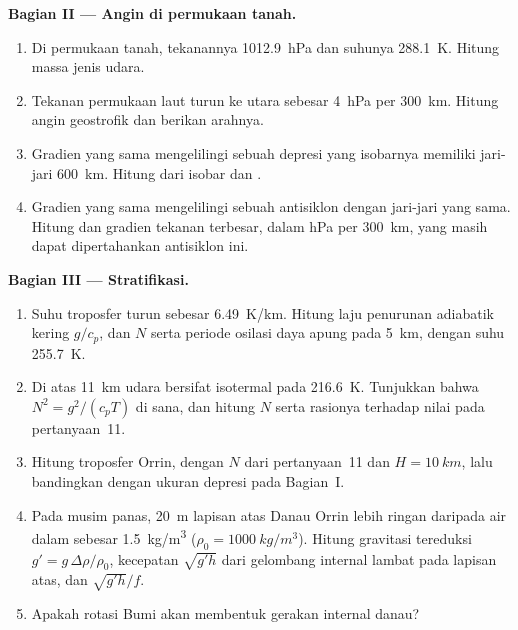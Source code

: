 \begin{problem}
\medskip\noindent\textbf{Bagian II --- Angin di permukaan tanah.}
\begin{enumerate}[resume]
\item Di permukaan tanah, tekanannya \qty{1012.9}{hPa} dan suhunya
  \qty{288.1}{K}. Hitung massa jenis udara.
\item Tekanan permukaan laut turun ke utara sebesar \qty{4}{hPa} per
  \qty{300}{km}. Hitung angin geostrofik dan berikan arahnya.
\item Gradien yang sama mengelilingi sebuah depresi yang isobarnya memiliki jari-jari
  \qty{600}{km}. Hitung  dari isobar dan
  .
\item Gradien yang sama mengelilingi sebuah antisiklon dengan jari-jari yang sama.
  Hitung  dan gradien tekanan terbesar, dalam
  \unit{hPa} per \qty{300}{km}, yang masih dapat dipertahankan antisiklon ini.
\end{enumerate}

\medskip\noindent\textbf{Bagian III --- Stratifikasi.}
\begin{enumerate}[resume]
\item Suhu troposfer turun sebesar \qty{6.49}{K/km}.
  Hitung laju penurunan adiabatik kering $g/c_p$, dan $N$ serta periode
  osilasi daya apung pada \qty{5}{km}, dengan suhu
  \qty{255.7}{K}.
\item Di atas \qty{11}{km} udara bersifat isotermal pada \qty{216.6}{K}. Tunjukkan bahwa
  $N^2 = g^2/(c_pT)$ di sana, dan hitung $N$ serta rasionya terhadap nilai
  pada pertanyaan~11.
\item Hitung  troposfer Orrin, dengan $N$ dari
  pertanyaan~11 dan $H = \qty{10}{km}$, lalu bandingkan dengan ukuran
  depresi pada Bagian~I.
\item Pada musim panas, \qty{20}{m} lapisan atas Danau Orrin lebih ringan daripada
  air dalam sebesar \qty{1.5}{kg/m^3} ($\rho_0 = \qty{1000}{kg/m^3}$). Hitung
  gravitasi tereduksi $g' = g\,\Delta\rho/\rho_0$, kecepatan $\sqrt{g'h}$ dari
  gelombang internal lambat pada lapisan atas, dan 
  $\sqrt{g'h}/f$.
\item Apakah rotasi Bumi akan membentuk gerakan internal danau?
\end{enumerate}


\end{problem}
